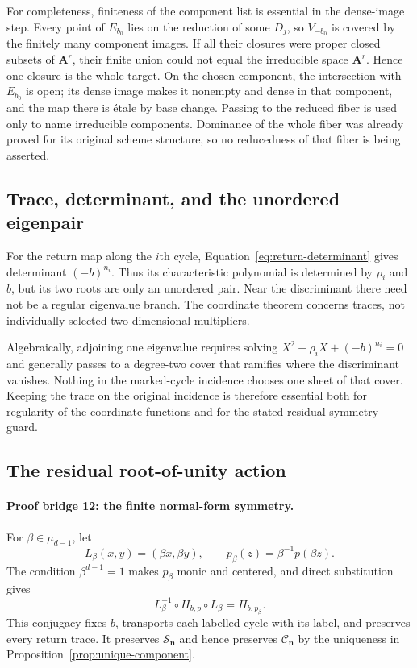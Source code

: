 \documentclass[11pt]{article}
\theoremstyle{definition}
\theoremstyle{remark}
\newcommand{\A}{\mathbf A}
\newcommand{\cC}{\mathcal C}
\newcommand{\cS}{\mathcal S}
\newcommand{\bn}{\mathbf n}
\begin{document}
For completeness, finiteness of the component list is essential in the
dense-image step.  Every point of $E_{b_0}$ lies on the reduction of some
$D_j$, so $V_{-b_0}$ is covered by the finitely many component images.  If
all their closures were proper closed subsets of $\A^r$, their finite union
could not equal the irreducible space $\A^r$.  Hence one closure is the whole
target.  On the chosen component, the intersection with $E_{b_0}$ is open;
its dense image makes it nonempty and dense in that component, and the map
there is étale by base change.  Passing to the reduced fiber is used only to
name irreducible components.  Dominance of the whole fiber was already
proved for its original scheme structure, so no reducedness of that fiber is
being asserted.

\subsection{Trace, determinant, and the unordered eigenpair}

For the return map along the $i$th cycle,
Equation~\eqref{eq:return-determinant} gives determinant $(-b)^{n_i}$.
Thus its characteristic polynomial is determined by $\rho_i$ and $b$, but
its two roots are only an unordered pair.  Near the discriminant there need
not be a regular eigenvalue branch.  The coordinate theorem concerns traces,
not individually selected two-dimensional multipliers.

Algebraically, adjoining one eigenvalue requires solving
$X^2-\rho_iX+(-b)^{n_i}=0$ and generally passes to a degree-two cover that
ramifies where the discriminant vanishes.  Nothing in the marked-cycle
incidence chooses one sheet of that cover.  Keeping the trace on the
original incidence is therefore essential both for regularity of the
coordinate functions and for the stated residual-symmetry guard.

\subsection{The residual root-of-unity action}

\paragraph{Proof bridge 12: the finite normal-form symmetry.}
For $\beta\in\mu_{d-1}$, let
\[
  L_\beta(x,y)=(\beta x,\beta y),
  \qquad
  p_\beta(z)=\beta^{-1}p(\beta z).
\]
The condition $\beta^{d-1}=1$ makes $p_\beta$ monic and centered, and direct
substitution gives
\[
  L_\beta^{-1}\circ H_{b,p}\circ L_\beta
  =
  H_{b,p_\beta}.
\]
This conjugacy fixes $b$, transports each labelled cycle with its label, and
preserves every return trace.  It preserves $\cS_{\bn}$ and hence preserves
$\cC_{\bn}$ by the uniqueness in
Proposition~\ref{prop:unique-component}.
\end{document}
